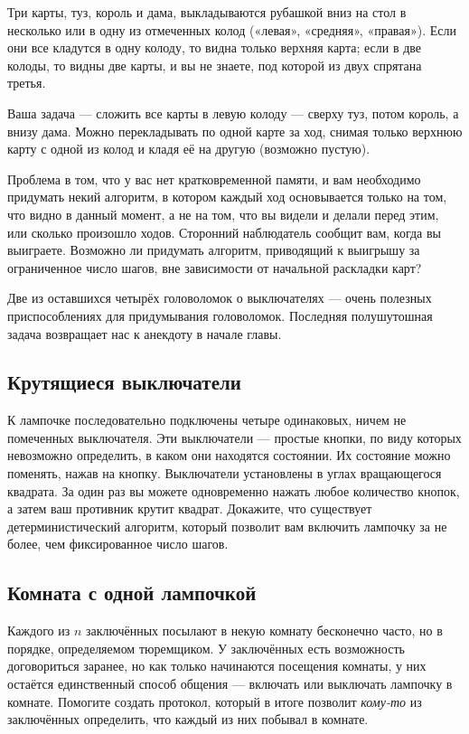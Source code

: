 Три карты, туз, король и дама, выкладываются рубашкой вниз на стол в несколько или в одну из отмеченных колод («левая», «средняя», «правая»).
Если они все кладутся в одну колоду, то видна только верхняя карта;
если в две колоды, то видны две карты, и вы не знаете, под которой из двух спрятана третья.

Ваша задача --- сложить все карты в левую колоду ---  сверху туз, потом король, а внизу дама.
Можно перекладывать по одной карте за ход, снимая только верхнюю карту с одной из колод и кладя её на другую (возможно пустую).

Проблема в том, что у вас нет кратковременной памяти, и вам необходимо придумать некий алгоритм, в котором каждый ход основывается только на том, что видно в данный момент, а не на том, что вы видели и делали перед этим, или сколько произошло ходов.
Сторонний наблюдатель сообщит вам, когда вы выиграете.
Возможно ли придумать алгоритм, приводящий к выигрышу за ограниченное число шагов, вне зависимости от начальной раскладки карт?

\medskip

Две из оставшихся четырёх головоломок о выключателях --- очень полезных приспособлениях для придумывания головоломок.
Последняя полушутошная задача возвращает нас к анекдоту в начале главы.

\subsection*{Крутящиеся выключатели}%

К лампочке последовательно подключены четыре одинаковых, ничем не помеченных выключателя.
Эти выключатели --- простые кнопки, по виду которых невозможно определить, в каком они находятся состоянии.
Их состояние можно поменять, нажав на кнопку.
Выключатели установлены в углах вращающегося квадрата.
За один раз вы можете одновременно нажать любое количество кнопок, а затем ваш противник крутит квадрат.
Докажите, что существует детерминистический 
алгоритм, который позволит вам включить лампочку за не более, чем фиксированное число шагов.

\subsection*{Комната с одной лампочкой}%

Каждого из $n$ заключённых посылают в некую комнату бесконечно часто, но в порядке, определяемом тюремщиком.
У заключённых есть возможность договориться заранее, но как только начинаются посещения комнаты, у них остаётся единственный способ общения --- включать или выключать лампочку в комнате.
Помогите создать протокол, который в итоге позволит \emph{кому-то} из заключённых определить, что каждый из них побывал в комнате.

